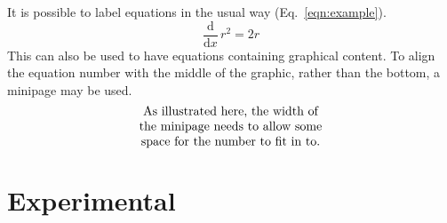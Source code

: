 \documentclass[journal=jacsat,manuscript=communication]{achemso}
\begin{document}
It is possible to label equations in the usual way (Eq.~\ref{eqn:example}).
\begin{equation}
  \frac{\mathrm{d}}{\mathrm{d}x} \, r^2 = 2r \label{eqn:example}
\end{equation}
This can also be used to have equations containing graphical
content. To align the equation number with the middle of the graphic,
rather than the bottom, a minipage may be used.
\begin{equation}
  \begin{minipage}[c]{0.80\linewidth}
    \centering
    As illustrated here, the width of \\
    the minipage needs to allow some  \\
    space for the number to fit in to.
  \end{minipage}
  \label{eqn:graphic}
\end{equation}

\section{Experimental}
\end{document}
